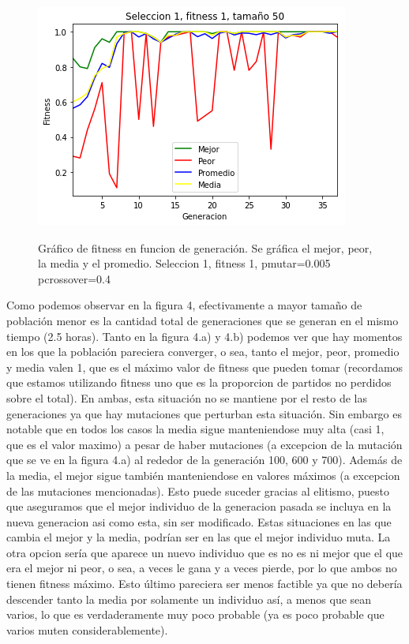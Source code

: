 \documentclass[A4paper,oneside,fleqn,11pt]{article}
\theoremstyle{definition}
\begin{document}
\begin{figure}[H]
	\captionsetup[subfigure]{position=b}
	\centering
		{\includegraphics[width=0.3\linewidth]{s1f1t50.png}}
	\caption{Gráfico de fitness en funcion de generación. Se gráfica el mejor, peor, la media y el promedio. Seleccion 1, fitness 1, pmutar=0.005 pcrossover=0.4}
\end{figure}

Como podemos observar en la figura 4, efectivamente a mayor tamaño de población menor es la cantidad total de generaciones que se generan en el mismo tiempo (2.5 horas). Tanto en la figura 4.a) y 4.b) podemos ver que hay momentos en los que la población pareciera converger, o sea, tanto el mejor, peor, promedio y media valen 1, que es el máximo valor de fitness que pueden tomar (recordamos que estamos utilizando fitness uno que es la proporcion de partidos no perdidos sobre el total). En ambas, esta situación no se mantiene por el resto de las generaciones ya que hay mutaciones que perturban esta situación. Sin embargo es notable que en todos los casos la media sigue manteniendose muy alta (casi 1, que es el valor maximo) a pesar de haber mutaciones (a excepcion de la mutación que se ve en la figura 4.a) al rededor de la generación  100, 600 y 700). Además de la media, el mejor sigue también manteniendose en valores máximos (a excepcion de las mutaciones mencionadas). Esto puede suceder gracias al elitismo, puesto que aseguramos que el mejor individuo de la generacion pasada se incluya en la nueva generacion asi como esta, sin ser modificado. Estas situaciones en las que cambia el mejor y la media, podrían ser en las que el mejor individuo muta. La otra opcion sería que aparece un nuevo individuo que es no es ni mejor que el que era el mejor ni peor, o sea, a veces le gana y a veces pierde, por lo que ambos no tienen fitness máximo. Esto último pareciera ser menos factible ya que no debería descender tanto la media por solamente un individuo así, a menos que sean varios, lo que es verdaderamente muy poco probable (ya es poco probable que varios muten considerablemente).
\end{document}
